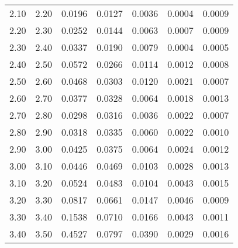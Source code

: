 \begin{tabular}{|c|c||c|c|c|c|c|}
    2.10 &    2.20 & 0.0196 & 0.0127 & 0.0036 & 0.0004 & 0.0009 \\ 
    2.20 &    2.30 & 0.0252 & 0.0144 & 0.0063 & 0.0007 & 0.0009 \\ 
    2.30 &    2.40 & 0.0337 & 0.0190 & 0.0079 & 0.0004 & 0.0005 \\ 
    2.40 &    2.50 & 0.0572 & 0.0266 & 0.0114 & 0.0012 & 0.0008 \\ 
    2.50 &    2.60 & 0.0468 & 0.0303 & 0.0120 & 0.0021 & 0.0007 \\ 
    2.60 &    2.70 & 0.0377 & 0.0328 & 0.0064 & 0.0018 & 0.0013 \\ 
    2.70 &    2.80 & 0.0298 & 0.0316 & 0.0036 & 0.0022 & 0.0007 \\ 
    2.80 &    2.90 & 0.0318 & 0.0335 & 0.0060 & 0.0022 & 0.0010 \\ 
    2.90 &    3.00 & 0.0425 & 0.0375 & 0.0064 & 0.0024 & 0.0012 \\ 
    3.00 &    3.10 & 0.0446 & 0.0469 & 0.0103 & 0.0028 & 0.0013 \\ 
    3.10 &    3.20 & 0.0524 & 0.0483 & 0.0104 & 0.0043 & 0.0015 \\ 
    3.20 &    3.30 & 0.0817 & 0.0661 & 0.0147 & 0.0046 & 0.0009 \\ 
    3.30 &    3.40 & 0.1538 & 0.0710 & 0.0166 & 0.0043 & 0.0011 \\ 
    3.40 &    3.50 & 0.4527 & 0.0797 & 0.0390 & 0.0029 & 0.0016 \\ 
\hline
\end{tabular}
